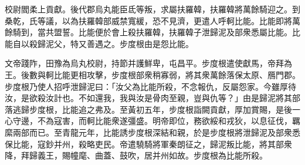 \begin{pinyinscope}
校尉閻柔上貢獻。後代郡烏丸能臣氐等叛，求屬扶羅韓，扶羅韓將萬餘騎迎之。到桑乾，氏等議，以為扶羅韓部威禁寬緩，恐不見濟，更遣人呼軻比能。比能即將萬餘騎到，當共盟誓。比能便於會上殺扶羅韓，扶羅韓子泄歸泥及部衆悉屬比能。比能自以殺歸泥父，特又善遇之。步度根由是怨比能。

文帝踐阼，田豫為烏丸校尉，持節并護鮮卑，屯昌平。步度根遣使獻馬，帝拜為王。後數與軻比能更相攻擊，步度根部衆稍寡弱，將其衆萬餘落保太原、鴈門郡。步度根乃使人招呼泄歸泥曰：「汝父為比能所殺，不念報仇，反屬怨家。今雖厚待汝，是欲殺汝計也。不如還我，我與汝是骨肉至親，豈與仇等？」由是歸泥將其部落逃歸步度根，比能追之弗及。至黃初五年，步度根詣闕貢獻，厚加賞賜，是後一心守邊，不為寇害，而軻比能衆遂彊盛。明帝即位，務欲綏和戎狄，以息征伐，羈縻兩部而已。至青龍元年，比能誘步度根深結和親，於是步度根將泄歸泥及部衆悉保比能，寇鈔并州，殺略吏民。帝遣驍騎將軍秦朗征之，歸泥叛比能，將其部衆降，拜歸義王，賜幢麾、曲蓋、鼓吹，居并州如故。步度根為比能所殺。


\end{pinyinscope}